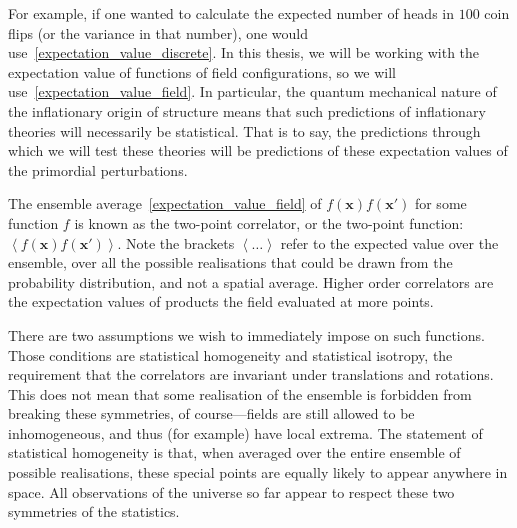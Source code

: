     For example, if one wanted to
    calculate the expected number of heads in $100$
    coin flips (or the variance in that number),
    one would use~\eqref{expectation_value_discrete}.
    In this thesis, we will be working with the expectation value of
    functions of field configurations, so we will use~\eqref{expectation_value_field}.
    In particular, the quantum mechanical nature of the inflationary
    origin of structure means that such predictions
    of inflationary theories will necessarily be statistical. That is to say, the predictions through
    which we will test these theories will be predictions of these expectation
    values of the primordial perturbations.


    The ensemble average~\eqref{expectation_value_field} of
    $f(\mathbf{x})f(\mathbf{x'})$ for some function $f$ is known as the
    two-point correlator, or the two-point function: $\left<f(\mathbf{x})f(\mathbf{x'})\right>$.
    Note the brackets $\left<\ldots\right>$ refer to the expected value over the ensemble,
    over all the possible realisations that could be drawn from the probability
    distribution, and not a spatial average.
    Higher order correlators are the
    expectation values of products the field evaluated at more points.


    There are two assumptions we wish to immediately impose on such functions.
    Those conditions are statistical homogeneity and statistical isotropy,
    the requirement that the correlators are invariant under translations and rotations.
    This does not mean that some realisation of the ensemble is forbidden from
    breaking these symmetries, of course---fields
    are still allowed to be inhomogeneous, and thus (for example) have local extrema.
    The statement of statistical homogeneity is that,
    when averaged over the entire ensemble of possible realisations, these special points
    are equally likely to appear anywhere in space.
    All observations of the universe so far appear to respect these two symmetries of the statistics.


